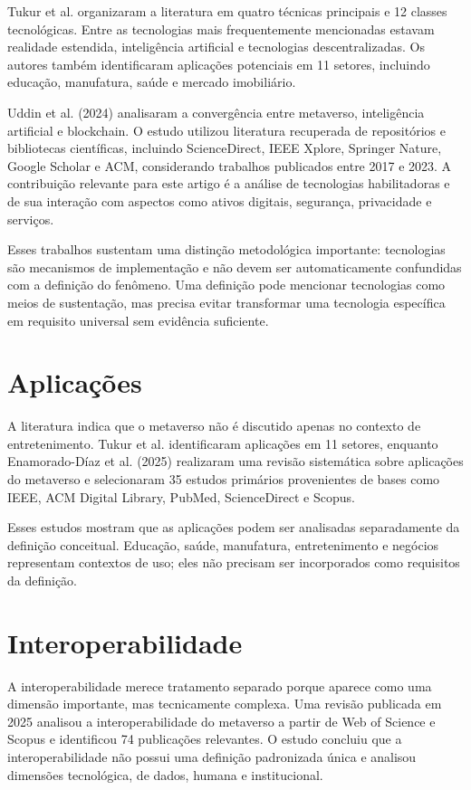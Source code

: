 Tukur et al. organizaram a literatura em quatro técnicas principais e 12 classes tecnológicas. Entre as tecnologias mais frequentemente mencionadas estavam realidade estendida, inteligência artificial e tecnologias descentralizadas. Os autores também identificaram aplicações potenciais em 11 setores, incluindo educação, manufatura, saúde e mercado imobiliário. \cite{tukur2024}

Uddin et al. (2024) analisaram a convergência entre metaverso, inteligência artificial e blockchain. O estudo utilizou literatura recuperada de repositórios e bibliotecas científicas, incluindo ScienceDirect, IEEE Xplore, Springer Nature, Google Scholar e ACM, considerando trabalhos publicados entre 2017 e 2023. A contribuição relevante para este artigo é a análise de tecnologias habilitadoras e de sua interação com aspectos como ativos digitais, segurança, privacidade e serviços. \cite{uddin2024}

Esses trabalhos sustentam uma distinção metodológica importante: tecnologias são mecanismos de implementação e não devem ser automaticamente confundidas com a definição do fenômeno. Uma definição pode mencionar tecnologias como meios de sustentação, mas precisa evitar transformar uma tecnologia específica em requisito universal sem evidência suficiente.

\section{Aplicações}

A literatura indica que o metaverso não é discutido apenas no contexto de entretenimento. Tukur et al. identificaram aplicações em 11 setores, enquanto Enamorado-Díaz et al. (2025) realizaram uma revisão sistemática sobre aplicações do metaverso e selecionaram 35 estudos primários provenientes de bases como IEEE, ACM Digital Library, PubMed, ScienceDirect e Scopus. \cite{tukur2024,enamorado2025}

Esses estudos mostram que as aplicações podem ser analisadas separadamente da definição conceitual. Educação, saúde, manufatura, entretenimento e negócios representam contextos de uso; eles não precisam ser incorporados como requisitos da definição.

\section{Interoperabilidade}

A interoperabilidade merece tratamento separado porque aparece como uma dimensão importante, mas tecnicamente complexa. Uma revisão publicada em 2025 analisou a interoperabilidade do metaverso a partir de Web of Science e Scopus e identificou 74 publicações relevantes. O estudo concluiu que a interoperabilidade não possui uma definição padronizada única e analisou dimensões tecnológica, de dados, humana e institucional. \cite{yang2025}

